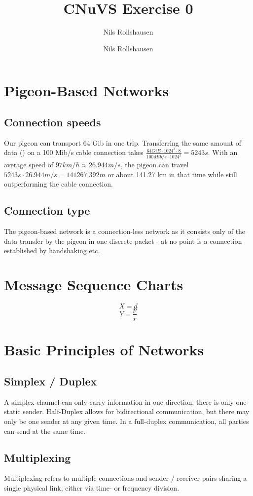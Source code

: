 \documentclass[a4paper, 11 pt, article, accentcolor=tud7b]{tudreport}
\title{CNuVS Exercise 0}
\author{Nils Rollshausen}
\subtitle{Nils Rollshausen}
\begin{document}
	\maketitle
	\section{Pigeon-Based Networks}
	\subsection*{Connection speeds}
	Our pigeon can transport 64 Gib in one trip. Transferring the same amount of data () on a 100 Mib/s cable connection takes $\frac{64 GiB \cdot 1024^{3} \cdot 8}{100 Mib/s \cdot 1024^{2}} = 5243 s$. With an average speed of $97 km/h \approx 26.944 m/s$, the pigeon can travel $5243 s \cdot 26.944 m/s = 141267.392 m$ or about 141.27 km in that time while still outperforming the cable connection.
	\subsection*{Connection type}
	The pigeon-based network is a connection-less network as it consists only of the data transfer by the pigeon in one discrete packet - at no point is a connection established by handshaking etc.
	
	\section{Message Sequence Charts}
	$$X = d$$
	$$Y = \frac{p}{r}$$
	
	\section{Basic Principles of Networks}
	\subsection*{Simplex / Duplex}
	A simplex channel can only carry information in one direction, there is only one static sender. Half-Duplex allows for bidirectional communication, but there may only be one sender at any given time. In a full-duplex communication, all parties can send at the same time.
	\subsection*{Multiplexing}
	Multiplexing refers to multiple connections and sender / receiver pairs sharing a single physical link, either via time- or frequency division.
\end{document}
